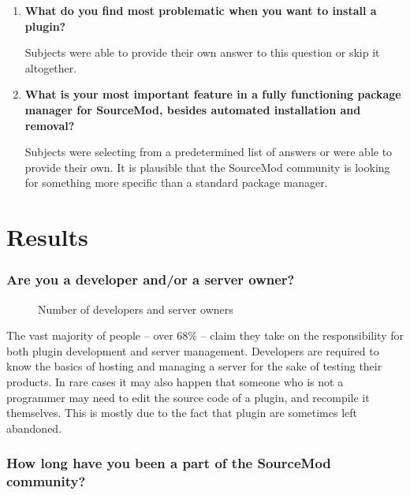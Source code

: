 \begin{enumerate}
    \item \textbf{What do you find most problematic when you want to install a plugin?}

    Subjects were able to provide their own answer to this question or skip it altogether.

    \item \textbf{What is your most important feature in a fully functioning package manager for SourceMod, besides automated installation and removal?}

    Subjects were selecting from a predetermined list of answers or were able to provide their own.
    It is plausible that the SourceMod community is looking for something more specific than a standard package manager.
\end{enumerate}

\section{Results}

\subsubsection{Are you a developer and/or a server owner?}

\begin{figure}[H]
  \centering
  \caption{Number of developers and server owners}
  \label{fig:number-of-developer-and-server-owners}
\end{figure}

The vast majority of people -- over 68\% -- claim they take on the responsibility for both plugin development and server management.
Developers are required to know the basics of hosting and managing a server for the sake of testing their products.
In rare cases it may also happen that someone who is not a programmer may need to edit the source code of a plugin, and recompile it themselves.
This is mostly due to the fact that plugin are sometimes left abandoned.

\subsubsection{How long have you been a part of the SourceMod community?}

